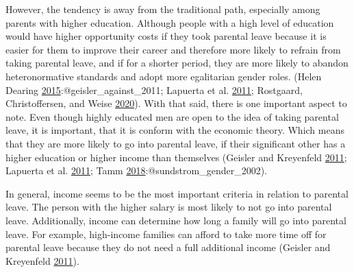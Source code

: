 \documentclass[
  12pt,
]{article}
\begin{document}
However, the tendency is away from the traditional path, especially among parents with higher education. Although people with a high level of education would have higher opportunity costs if they took parental leave because it is easier for them to improve their career and therefore more likely to refrain from taking parental leave, and if for a shorter period, they are more likely to abandon heteronormative standards and adopt more egalitarian gender roles. (Helen Dearing \protect\hyperlink{ref-helen_dearing_does_2015}{2015}:@geisler\_against\_2011; Lapuerta et al. \protect\hyperlink{ref-lapuerta_individual_2011}{2011}; Rostgaard, Christoffersen, and Weise \protect\hyperlink{ref-rostgaard_parental_2020}{2020}).
With that said, there is one important aspect to note. Even though highly educated men are open to the idea of taking parental leave, it is important, that it is conform with the economic theory. Which means that they are more likely to go into parental leave, if their significant other has a higher education or higher income than themselves (Geisler and Kreyenfeld \protect\hyperlink{ref-geisler_against_2011}{2011}; Lapuerta et al. \protect\hyperlink{ref-lapuerta_individual_2011}{2011}; Tamm \protect\hyperlink{ref-tamm_fathers_2018}{2018}:@sundstrom\_gender\_2002).

In general, income seems to be the most important criteria in relation to parental leave. The person with the higher salary is most likely to not go into parental leave. Additionally, income can determine how long a family will go into parental leave. For example, high-income families can afford to take more time off for parental leave because they do not need a full additional income (Geisler and Kreyenfeld \protect\hyperlink{ref-geisler_against_2011}{2011}).
\end{document}
